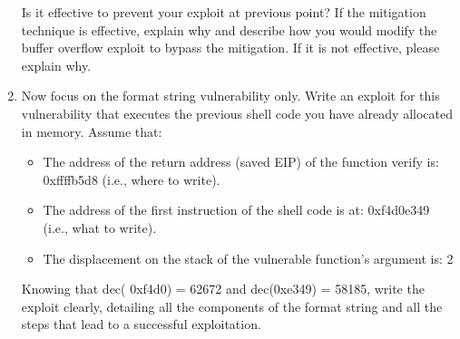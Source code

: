 \begin{enumerate}
        Is it effective to prevent your exploit at previous point? 
        If the mitigation technique is effective, explain why and describe how you would modify the buffer overflow exploit to bypass the mitigation.
        If it is not effective, please explain why.
    \item Now focus on the format string vulnerability only. Write an exploit for this vulnerability that executes the previous shell code you have already allocated in memory. 
    Assume that:
    \begin{itemize}
        \item The address of the return address (saved EIP) of the function verify is: 0xffffb5d8 (i.e., where to write).
        \item The address of the first instruction of the shell code is at: 0xf4d0e349 (i.e., what to write).
        \item The displacement on the stack of the vulnerable function's argument is: 2
    \end{itemize}
    Knowing that dec( 0xf4d0) = 62672 and dec(0xe349) = 58185, write the exploit clearly, detailing all the  components of the format string and all the steps that lead to a successful exploitation.
    
\end{enumerate}

